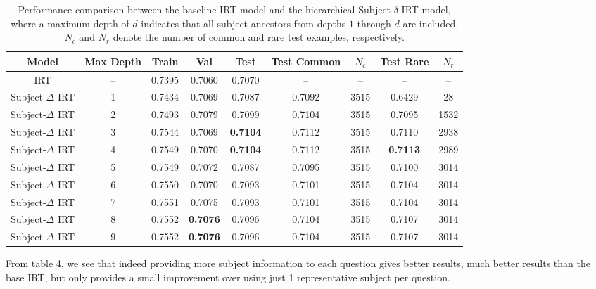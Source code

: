 \documentclass[11pt]{article}
\begin{document}
\begin{table}[H]
\centering
\small
\setlength{\tabcolsep}{4pt}
\begin{tabular}{c|c|ccc|cc|cc}
\hline
\textbf{Model} & \textbf{Max Depth}
& \textbf{Train} & \textbf{Val} & \textbf{Test}
& \textbf{Test Common} & \textbf{$N_c$}
& \textbf{Test Rare} & \textbf{$N_r$} \\
\hline
IRT & --
& 0.7395 & 0.7060 & 0.7070
& -- & --
& -- & -- \\

Subject-$\Delta$ IRT & 1
& 0.7434 & 0.7069 & 0.7087
& 0.7092 & 3515
& 0.6429 & 28 \\

Subject-$\Delta$ IRT & 2
& 0.7493 & 0.7079 & 0.7099
& 0.7104 & 3515
& 0.7095 & 1532 \\

Subject-$\Delta$ IRT & 3
& 0.7544 & 0.7069 & \textbf{0.7104}
& 0.7112 & 3515
& 0.7110 & 2938 \\

Subject-$\Delta$ IRT & 4
& 0.7549 & 0.7070 & \textbf{0.7104}
& 0.7112 & 3515
& \textbf{0.7113} & 2989 \\

Subject-$\Delta$ IRT & 5
& 0.7549 & 0.7072 & 0.7087
& 0.7095 & 3515
& 0.7100 & 3014 \\

Subject-$\Delta$ IRT & 6
& 0.7550 & 0.7070 & 0.7093
& 0.7101 & 3515
& 0.7104 & 3014 \\

Subject-$\Delta$ IRT & 7
& 0.7551 & 0.7075 & 0.7093
& 0.7101 & 3515
& 0.7104 & 3014 \\

Subject-$\Delta$ IRT & 8
& 0.7552 & \textbf{0.7076} & 0.7096
& 0.7104 & 3515
& 0.7107 & 3014 \\

Subject-$\Delta$ IRT & 9
& 0.7552 & \textbf{0.7076} & 0.7096
& 0.7104 & 3515
& 0.7107 & 3014 \\

\hline
\end{tabular}
\caption{Performance comparison between the baseline IRT model and the hierarchical Subject-$\delta$ IRT model, where a maximum depth of $d$ indicates that all subject ancestors from depths $1$ through $d$ are included. $N_c$ and $N_r$ denote the number of common and rare test examples, respectively.}
\label{tab:hierarchical_subject_delta_results}
\end{table}

From table 4, we see that indeed providing more subject information to each question gives better results, much better results than the base IRT, but only provides a small improvement over using just 1 representative subject per question.
\end{document}
